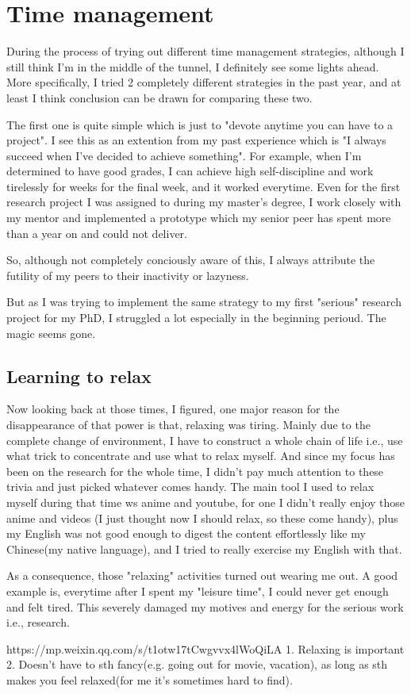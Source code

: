 \section{Time management}
\label{sec:time}
During the process of trying out different time management strategies, although I still think I'm in the middle of the tunnel, I definitely see some lights ahead.
More specifically, I tried 2 completely different strategies in the past year, and at least I think conclusion can be drawn for comparing these two.

The first one is quite simple which is just to "devote anytime you can have to a project".
I see this as an extention from my past experience which is "I always succeed when I've decided to achieve something".
For example, when I'm determined to have good grades, I can achieve high self-discipline and work tirelessly for weeks for the final week, and it worked everytime.
Even for the first research project I was assigned to during my master's degree, I work closely with my mentor and implemented a prototype 
which my senior peer has spent more than a year on and could not deliver.

So, although not completely conciously aware of this, I always attribute the futility of my peers to their inactivity or lazyness.

But as I was trying to implement the same strategy to my first "serious" research project for my PhD, I struggled a lot especially in the beginning perioud.
The magic seems gone.
\subsection{Learning to relax}
Now looking back at those times, I figured, one major reason for the disappearance of that power is that, relaxing was tiring.
Mainly due to the complete change of environment, I have to construct a whole chain of life i.e., use what trick to concentrate and use what to relax myself.
And since my focus has been on the research for the whole time, I didn't pay much attention to these trivia and just picked whatever comes handy.
The main tool I used to relax myself during that time ws anime and youtube, for one I didn't really enjoy those anime and videos
(I just thought now I should relax, so these come handy), plus my English was not good enough to digest the content effortlessly 
like my Chinese(my native language), and I tried to really exercise my English with that.

As a consequence, those "relaxing" activities turned out wearing me out. A good example is, everytime after I spent my "leisure time", I could never get enough and felt tired.
This severely damaged my motives and energy for the serious work i.e., research.

https://mp.weixin.qq.com/s/t1otw17tCwgvvx4lWoQiLA
1. Relaxing is important
2. Doesn't have to sth fancy(e.g. going out for movie, vacation), as long as sth makes you feel relaxed(for me it's sometimes hard to find).